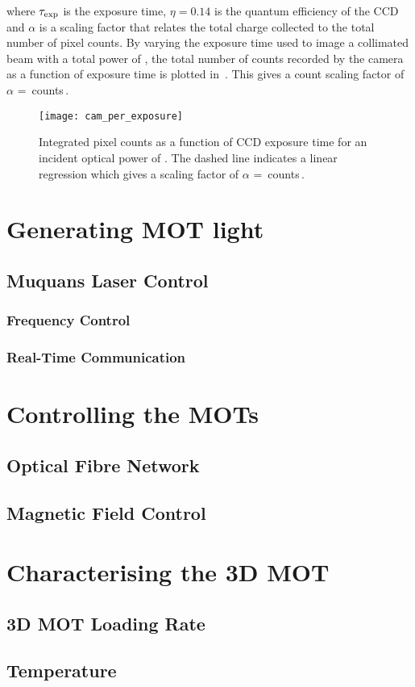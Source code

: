 where \(\tau_\textnormal{exp}\) is the exposure time, \(\eta = 0.14\) is the
quantum efficiency of the CCD and \(\alpha\) is a scaling factor that relates
the total charge collected to the total number of pixel counts. By varying
the exposure time used to image a collimated beam with a total power of
, the total number of counts recorded by the
camera as a function of exposure time is plotted
in~. This gives a count scaling factor of
\(\alpha\) =
\,counts\,\sivalue{}{\per\micro\second\per\micro\watt}.
\begin{figure}
    \centering
    \texttt{[image: cam\_per\_exposure]}
    \caption[Integrated pixel counts as a function of CCD exposure time.]{Integrated pixel counts as a function of CCD exposure time for an incident
optical power of . The dashed line indicates a
linear regression which gives a scaling factor of \(\alpha\) =
\,counts\,\sivalue{}{\per\micro\second\per\micro\watt}.}
    \label{fig:camera_counts}
\end{figure}
\section{Generating MOT light}
\subsection{Muquans Laser Control}
\subsubsection{Frequency Control}
\subsubsection{Real-Time Communication} \label{subsec:muquans_comm}

\section{Controlling the MOTs}
\subsection{Optical Fibre Network}
\subsection{Magnetic Field Control}

\section{Characterising the 3D MOT}
\subsection{3D MOT Loading Rate}\label{subsec:loading_rate}
\subsection{Temperature}

